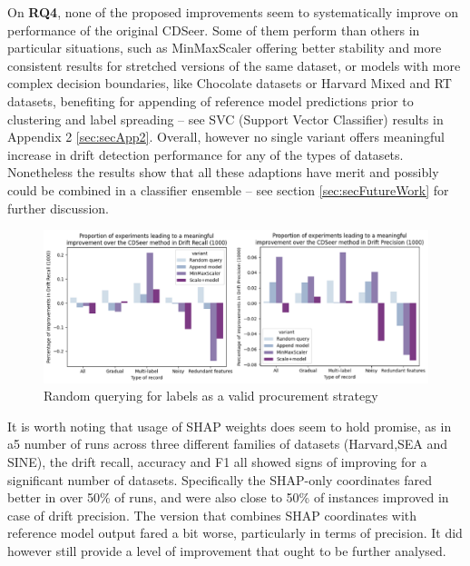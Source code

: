 \documentclass{svproc}
\begin{document}
On \textbf{RQ4}, none of the proposed improvements seem to systematically improve on performance of the original CDSeer. Some of them perform than others in particular situations, such as MinMaxScaler offering better stability and more consistent results for stretched versions of the same dataset, or models with more complex decision boundaries, like Chocolate datasets or Harvard Mixed and RT datasets, benefiting for appending of reference model predictions prior to clustering and label spreading – see SVC (Support Vector Classifier) results in Appendix 2 \ref{sec:secApp2}. Overall, however no single variant offers meaningful increase in drift detection performance for any of the types of datasets. Nonetheless the results show that all these adaptions have merit and possibly could be combined in a classifier ensemble – see section \ref{sec:secFutureWork} for further discussion.

\begin{figure}
	\centering
	\includegraphics[scale=.7]{figures/Fig13_res.png}
	\caption{Random querying for labels as a valid procurement strategy}
	\label{fig:fig13}
\end{figure}


It is worth noting that usage of SHAP weights does seem to hold promise, as in a5 number of runs across three different families of datasets (Harvard,SEA and SINE), the drift recall, accuracy and F1 all showed signs of improving for a significant number of datasets. Specifically the SHAP-only coordinates  fared better in over 50\% of runs, and were also close to 50\% of instances improved in case of drift precision. The version that combines SHAP coordinates with reference model output fared a bit worse, particularly in terms of precision. It did however still provide a level of improvement that ought to be further analysed.
\end{document}
